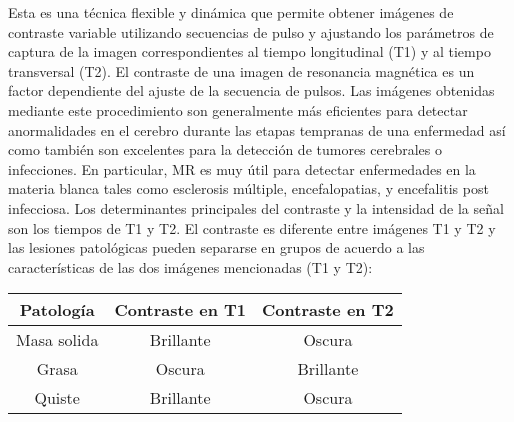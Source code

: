 Esta es una técnica flexible y dinámica que permite obtener imágenes de contraste variable utilizando secuencias de pulso y ajustando los parámetros de captura de la imagen correspondientes al tiempo longitudinal (T1) y al tiempo transversal (T2). El contraste de una imagen de resonancia magnética es un factor dependiente del ajuste de la secuencia de pulsos. Las imágenes obtenidas mediante este procedimiento son generalmente más eficientes para detectar anormalidades en el cerebro durante las etapas tempranas de una enfermedad así como también son excelentes para la detección de tumores cerebrales o infecciones. En particular, MR es muy útil para detectar enfermedades en la materia blanca tales como esclerosis múltiple, encefalopatias, y encefalitis post infecciosa. Los determinantes principales del contraste y la intensidad de la señal son los tiempos de T1 y T2. El contraste es diferente entre imágenes T1 y T2 y las lesiones patológicas pueden separarse en grupos de acuerdo a las características de las dos imágenes mencionadas (T1 y T2):
\begin{table}[hp]
	\centering
	\begin{tabular}{c|c c}
	Patología & Contraste en T1 & Contraste en T2   \\ 
	\hline Masa solida & Brillante & Oscura  \\ 
	Grasa & Oscura & Brillante  \\ 
	Quiste &	Brillante &	Oscura  \\ 
	\end{tabular} 
\end{table}

